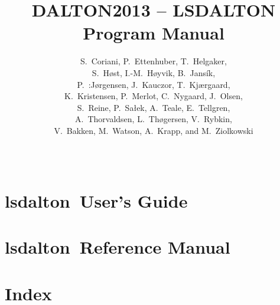 \documentclass[11pt]{report}
\newcommand{\lsdalton}{{\sc lsdalton}}
\begin{document}
%

%
\baselineskip=15pt
%
\title{DALTON2013 -- LSDALTON Program Manual}

%
\author{S.~Coriani,
P.~Ettenhuber, 
T.~Helgaker,\\ 
S.~H{\o}st,  
I.-M.~H{\o}yvik,
B.~Jans{\'i}k,\\
P.~:J{\o}rgensen, 
J.~Kauczor,
T.~Kj{\ae}rgaard,\\
K.~Kristensen,
P.~Merlot,
C.~Nygaard,
J.~Olsen, \\ 
S.~Reine,
P.~Sa{\l}ek,
A.~Teale,
E.~Tellgren,\\
A.~Thorvaldsen,
L.~Th{\o}gersen, 
V.~Rybkin, \\
V.~Bakken,
M.~Watson,
A.~Krapp,
and M.~Ziolkowski}
%
\date{\mbox{\ }}
%
\maketitle

\tableofcontents



%
%
\part{\lsdalton\ User's Guide}


%
%
%
%
%
%
%
%
%
%
%
%
%
%
%
%
\part{\lsdalton\ Reference Manual}

%
%
%
%
%
%
%
%
%
%
%
%
%
%
%
%
%
%
%
%
%
%

%
\part{Index}
\printindex
\end{document}
